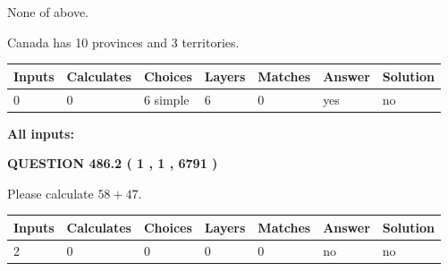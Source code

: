 \documentclass[12pt]{article}
\begin{document}
 
 None of above.
 
 
\noindent{}
 
 
Canada has 10  provinces and 3 territories.
 
 
\noindent{}
 
 
   
   
   
   
\noindent\begin{tabular}{|l|l|l|l|l|l|l|}
 \hline
Inputs & Calculates & Choices & Layers & Matches & Answer & Solution \\ \hline
 0  & 
 0  & 
 6
  simple  
  & 
 6  & 
 0  & 
  yes & 
  no 
  \\ \hline
 \end{tabular}
   
   
   
   
\noindent{}
   
   
   
   
\noindent\vspace{0.1in}\hspace{-0.08in} {\textbf{\Large{All inputs: }}}
   
   
  
\vspace{0.2in}
  
{\textbf{\Large{QUESTION
486.2 
 ( 1 , 1 , 6791 )
}}}
  
  
 
Please calculate $ %
58 +  %
47 $.
 
 
   
   
   
   
\noindent\begin{tabular}{|l|l|l|l|l|l|l|}
 \hline
Inputs & Calculates & Choices & Layers & Matches & Answer & Solution \\ \hline
 2  & 
 0  & 
 0
  & 
 0  & 
 0  & 
  no & 
  no 
  \\ \hline
 \end{tabular}
   
   
   
   
\noindent{}
   
\end{document}

